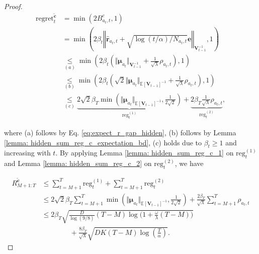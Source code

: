 \begin{proof}
\begin{equation}
\begin{aligned}
\label{eq: hidden_regret_c}
\text{regret}_{t}^{\tilde{\boldsymbol{c}}}
& =
\min \left(
2 B_{a_t,t}^{c}, 1 \right)  \\
& =
\min \left( 
2 
\beta_t 
\left \Vert \boldsymbol{\hat{r}}_{a_t,t} + \sqrt{ \log(t/\alpha)/N_{a_t,t}} \boldsymbol{e} \right \Vert_{\boldsymbol{V}_{t-1}^{-1}},
1 \right) \\
& \underset{(a)}{\leq}
\min \left( 
2 \beta_t 
\left(
\Vert \boldsymbol{\mu}_{a_t} \Vert_{\boldsymbol{V}_{t-1}^{-1}}
+
\frac{1}{\sqrt{\lambda}} \rho_{a_t,t}
\right), 
1 \right)\\
& \underset{(b)}{\leq}
\min \left( 
2 \beta_t 
\left(
\sqrt{2} \Vert \boldsymbol{\mu}_{a_t} \Vert_{\mathbb{E}\left[\boldsymbol{V}_{t-1}\right]^{-1}}
+
\frac{1}{\sqrt{\lambda}} \rho_{a_t,t}
\right), 
1 \right)\\
& \underset{(c)}{\leq}
\underbrace{
2\sqrt{2} \beta_T 
\min \left( 
\Vert \boldsymbol{\mu}_{a_t} \Vert_{\mathbb{E}\left[\boldsymbol{V}_{t-1}\right]^{-1}},
\frac{1}{2\sqrt{2}}  \right)
}_{\text{reg}_{t}^{(1)}}
+
\underbrace{
2\beta_T \frac{1}{\sqrt{\lambda}} 
\rho_{a_t,t}
}_{\text{reg}_{t}^{(2)}},
\end{aligned}
\end{equation}

where (a) follows by Eq. \ref{eq:expect_r_gap_hidden}, (b) follows by Lemma \ref{lemma: hidden_sum_reg_c_expectation_bd}, (c) holds due to $\beta_t \geq 1$ and increasing with $t$. By applying Lemma \ref{lemma: hidden_sum_reg_c_1} on $\text{reg}_{t}^{(1)}$ and Lemma \ref{lemma: hidden_sum_reg_c_2} on $\text{reg}_{t}^{(2)}$, we have  

\begin{equation}
\begin{aligned}
\label{eq: hidden_regret_c}
R_{M+1:T}^{\tilde{\boldsymbol{c}}}
& \leq 
\sum_{t=M+1}^{T} \text{reg}_{t}^{(1)} +
\sum_{t=M+1}^{T} \text{reg}_{t}^{(2)} \\
& \leq
2\sqrt{2} \beta_T 
\sum_{t=M+1}^{T}
\min \left( 
\Vert \boldsymbol{\mu}_{a_t} \Vert_{\mathbb{E}\left[\boldsymbol{V}_{t-1}\right]^{-1}},
\frac{1}{2\sqrt{2}}  \right)
+
\frac{2\beta_T}{\sqrt{\lambda}}
\sum_{t=M+1}^{T} \rho_{a_t,t} \\
& \leq
2\beta_T \sqrt{\frac{D}{\log(9/8)} (T-M) \log\Big( 1 + \frac{\omega}{\lambda} (T-M) \Big) } \\
& \qquad \qquad +
\frac{8\beta_T}{\sqrt{\lambda}}
\sqrt{ DK(T-M) \log \left( \frac{T}{\alpha} \right)}.
\end{aligned}
\end{equation}



\end{proof}
